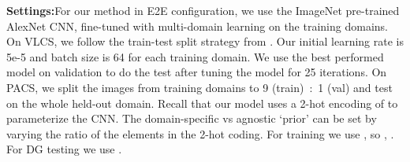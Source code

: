 \documentclass[10pt,twocolumn,letterpaper]{article}
\begin{document}
\vspace{0.1cm}\noindent\textbf{Settings:}\quad For our method in E2E configuration, we use the ImageNet pre-trained AlexNet CNN, fine-tuned with multi-domain learning on the training domains. On VLCS, we follow the train-test split strategy from \cite{ghifary2015domain}. 
Our initial learning rate is 5e-5 and batch size is 64 for each training domain. We use the best performed model on validation to do the test after tuning the model for 25 iterations.  On PACS, we split the images from training domains to 9 (train)~:~1 (val) and test on the whole held-out domain. 
Recall that our model uses a 2-hot encoding of  to parameterize the CNN. The domain-specific vs agnostic `prior' can be set by varying the ratio  of the elements in the 2-hot coding. For training we use , so  , . For DG testing  we use .
\begin{table*}[t]
\small
\begin{center}
\caption{Comparison against Undo-Bias \cite{ECCV12_Khosla} on the VLCS benchmark using classic SIFT-BOW features, and our shallow model Ours-MLP. Average precision (\%) and mean average precision (\%) of binary 1-v-all classification in unseen domains.}
\label{tab:binary+shallow}
\end{center}
\end{table*}
\end{document}
